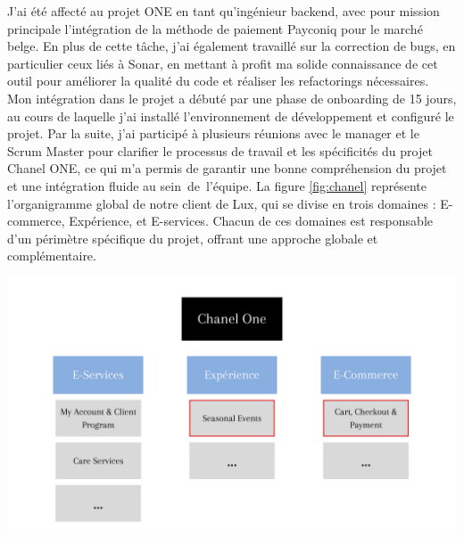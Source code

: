 J'ai été affecté au projet ONE en tant qu'ingénieur backend, avec pour mission principale l'intégration de la méthode de paiement Payconiq pour le marché belge. En plus de cette tâche, j'ai également travaillé sur la correction de bugs, en particulier ceux liés à Sonar, en mettant à profit ma solide connaissance de cet outil pour améliorer la qualité du code et réaliser les refactorings nécessaires. Mon intégration dans le projet a débuté par une phase de onboarding de 15 jours, au cours de laquelle j'ai installé l'environnement de développement et configuré le projet. Par la suite, j'ai participé à plusieurs réunions avec le manager et le Scrum Master pour clarifier le processus de travail et les spécificités du projet Chanel ONE, ce qui m'a permis de garantir une bonne compréhension du projet et une intégration fluide au sein de l'équipe.
La figure \ref{fig:chanel} représente l'organigramme global de notre client de Lux, qui se divise en trois domaines : E-commerce, Expérience, et E-services. Chacun de ces domaines est responsable d'un périmètre spécifique du projet, offrant une approche globale et complémentaire.
\begin{center}
    \centering
    \includegraphics[width=19cm]{Figures/chanelOne.png}
    \label{fig:chanel}
\end{center}

